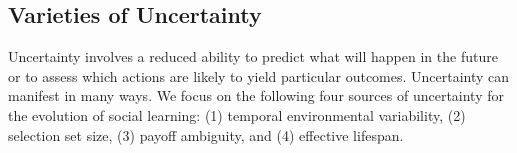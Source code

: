 \documentclass[letterpaper,11.5pt]{scrartcl}
\newcommand{\mt}[1]{{\textcolor{myorange} {({\tiny MT:} #1)}}}
\newcommand{\cm}[1]{{\textcolor{mypurple} {({\tiny CM:} #1)}}}
\begin{document}




\subsection{Varieties of Uncertainty}

Uncertainty involves a reduced ability to predict what will happen in the future or to assess which actions are likely to yield particular outcomes. Uncertainty can manifest in many ways. We focus on the following four sources of uncertainty for the evolution of social learning: (1) temporal environmental variability, (2) selection set size, (3) payoff ambiguity, and (4) effective lifespan.
\end{document}
